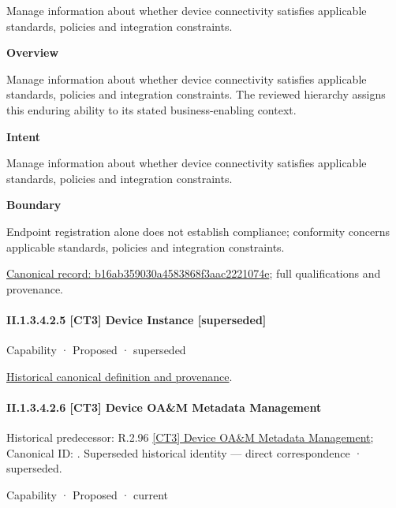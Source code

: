 Manage information about whether device connectivity satisfies applicable standards, policies and integration constraints.



\textbf{Overview}



Manage information about whether device connectivity satisfies applicable standards, policies and integration constraints. The reviewed hierarchy assigns this enduring ability to its stated business-enabling context.



\textbf{Intent}



Manage information about whether device connectivity satisfies applicable standards, policies and integration constraints.



\textbf{Boundary}



Endpoint registration alone does not establish compliance; conformity concerns applicable standards, policies and integration constraints.


{\footnotesize \href{../../../../continuum/strategy/capability/b16ab359030a4583868f3aac2221074e.md}{Canonical record: b16ab359030a4583868f3aac2221074e}; full qualifications and provenance.}\par
\paragraph*{II.1.3.4.2.5 [CT3] Device Instance [superseded]}
\label{navigation:II.1.3.4.2.5}

\label{element:dd860926038f41e082c56e38cbb5ab95}
{\small Capability · Proposed · superseded}\par
\href{../../../../continuum/strategy/capability/dd860926038f41e082c56e38cbb5ab95.md}{Historical canonical definition and provenance}.\par
\paragraph*{II.1.3.4.2.6 [CT3] Device OA\&M Metadata Management}
\label{navigation:II.1.3.4.2.6}

{\small Historical predecessor: R.2.96 \hyperref[element:a398c72bef094dee96c96d97994449fb]{[CT3] Device OA\&M Metadata Management}; Canonical ID: \texttt{}. Superseded historical identity — direct correspondence · superseded.}\par
\label{element:659bb194a7ef42ab9ba8a938adb5c179}
{\small Capability · Proposed · current}\par

